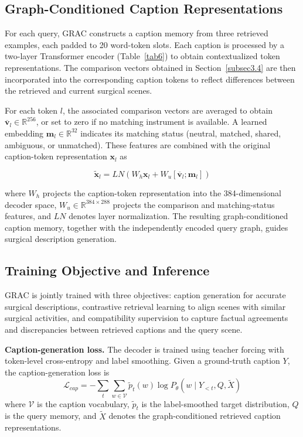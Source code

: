 \documentclass[11pt]{article}
\begin{document}
\subsection{Graph-Conditioned Caption Representations}\label{subsec3.5}

For each query, GRAC constructs a caption memory from three retrieved examples, each padded to 20 word-token slots. Each caption is processed by a two-layer Transformer encoder (Table~\ref{tab6}) to obtain contextualized token representations. The comparison vectors obtained in Section~\ref{subsec3.4} are then incorporated into the corresponding caption tokens to reflect differences between the retrieved and current surgical scenes.

For each token $l$, the associated comparison vectors are averaged to obtain $\overline{\mathbf{v}}_l\in\mathbb{R}^{256}$, or set to zero if no matching instrument is available. A learned embedding $\mathbf{m}_l\in\mathbb{R}^{32}$ indicates its matching status (neutral, matched, shared, ambiguous, or unmatched). These features are combined with the original caption-token representation $\mathbf{x}_l$ as

\begin{equation}
\widetilde{\mathbf{x}}_{l} = LN\left( W_{h}\mathbf{x}_{l} + W_{u}\left[ \overline{\mathbf{v}}_{l};\mathbf{m}_{l} \right] \right)
\label{eq4}
\end{equation}

\noindent where $W_h$ projects the caption-token representation into the 384-dimensional decoder space, $W_u\in\mathbb{R}^{384\times288}$ projects the comparison and matching-status features, and $LN$ denotes layer normalization. The resulting graph-conditioned caption memory, together with the independently encoded query graph, guides surgical description generation.


\subsection{Training Objective and Inference}\label{subsec3.6}

GRAC is jointly trained with three objectives: caption generation for accurate surgical descriptions, contrastive retrieval learning to align scenes with similar surgical activities, and compatibility supervision to capture factual agreements and discrepancies between retrieved captions and the query scene.

\textbf{Caption-generation loss.} The decoder is trained using teacher forcing with token-level cross-entropy and label smoothing. Given a ground-truth caption $Y$, the caption-generation loss is
\begin{equation}
\mathcal{L}_{cap} = -\sum_{t}\sum_{w \in \mathcal{V}}\widetilde{p}_{t}(w)\log P_{\theta}\left( w \mid Y_{<t},Q,\widetilde{X} \right)
\label{eq5}
\end{equation}
where $\mathcal{V}$ is the caption vocabulary, $\widetilde{p}_{t}$ is the label-smoothed target distribution, $Q$ is the query memory, and $\widetilde{X}$ denotes the graph-conditioned retrieved caption representations.
\end{document}
